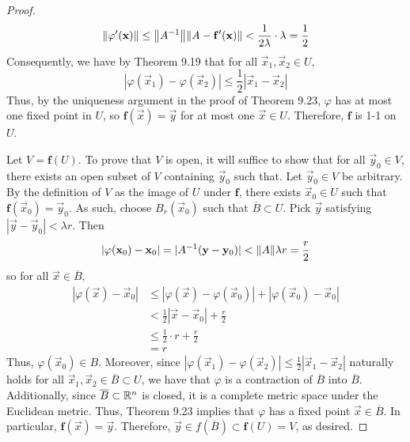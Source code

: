 \documentclass[../notes.tex]{subfiles}
\begin{document}
\begin{itemize}
\begin{enumerate}[label={(\alph*)}]
\begin{proof}
\begin{equation*}
                \norm{\varphi'(\mathbf{x})} \leq \norm{A^{-1}}\norm{A-\mathbf{f}'(\mathbf{x})}
                < \frac{1}{2\lambda}\cdot\lambda
                = \frac{1}{2}
            \end{equation*}
            Consequently, we have by Theorem 9.19 that for all $\vec{x}_1,\vec{x}_2\in U$,
            \begin{equation*}
                |\varphi(\vec{x}_1)-\varphi(\vec{x}_2)| \leq \frac{1}{2}|\vec{x}_1-\vec{x}_2|
            \end{equation*}
            Thus, by the uniqueness argument in the proof of Theorem 9.23, $\varphi$ has at most one fixed point in $U$, so $\mathbf{f}(\vec{x})=\vec{y}$ for at most one $\vec{x}\in U$. Therefore, $\mathbf{f}$ is 1-1 on $U$.\par
            Let $V=\mathbf{f}(U)$. To prove that $V$ is open, it will suffice to show that for all $\vec{y}_0\in V$, there exists an open subset of $V$ containing $\vec{y}_0$ such that. Let $\vec{y}_0\in V$ be arbitrary. By the definition of $V$ as the image of $U$ under $\mathbf{f}$, there exists $\vec{x}_0\in U$ such that $\mathbf{f}(\vec{x}_0)=\vec{y}_0$. As such, choose $B_r(\vec{x}_0)$ such that $\overline{B}\subset U$. Pick $\vec{y}$ satisfying $|\vec{y}-\vec{y}_0|<\lambda r$. Then
            \begin{equation*}
                |\varphi(\mathbf{x}_0)-\mathbf{x}_0| = |A^{-1}(\mathbf{y}-\mathbf{y}_0)|
                < \norm{A}\lambda r
                = \frac{r}{2}
            \end{equation*}
            so for all $\vec{x}\in\overline{B}$,
            \begin{align*}
                |\varphi(\vec{x})-\vec{x}_0| &\leq |\varphi(\vec{x})-\varphi(\vec{x}_0)|+|\varphi(\vec{x}_0)-\vec{x}_0|\\
                &< \frac{1}{2}|\vec{x}-\vec{x}_0|+\frac{r}{2}\\
                &\leq \frac{1}{2}\cdot r+\frac{r}{2}\\
                &= r
            \end{align*}
            Thus, $\varphi(\vec{x}_0)\in B$. Moreover, since $|\varphi(\vec{x}_1)-\varphi(\vec{x}_2)| \leq \frac{1}{2}|\vec{x}_1-\vec{x}_2|$ naturally holds for all $\vec{x}_1,\vec{x}_2\in\overline{B}\subset U$, we have that $\varphi$ is a contraction of $\overline{B}$ into $\overline{B}$. Additionally, since $\overline{B}\subset\mathbb{R}^n$ is closed, it is a complete metric space under the Euclidean metric. Thus, Theorem 9.23 implies that $\varphi$ has a fixed point $\vec{x}\in\overline{B}$. In particular, $\mathbf{f}(\vec{x})=\vec{y}$. Therefore, $\vec{y}\in f(\overline{B})\subset\mathbf{f}(U)=V$, as desired.

\end{proof}
\end{enumerate}
\end{itemize}
\end{document}
